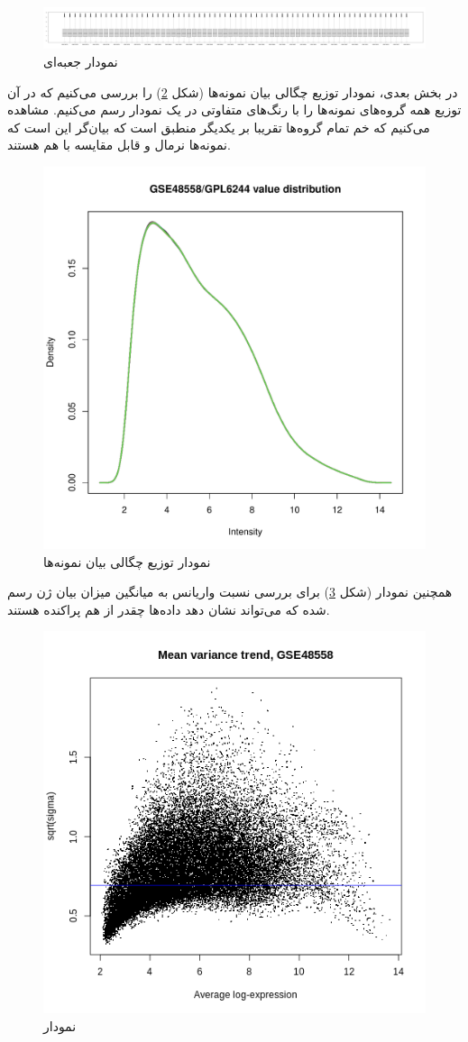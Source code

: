 \documentclass{article}
\begin{document}
\begin{figure}[h!]
	\centering
	\includegraphics[width=0.8\columnwidth]{figs/boxplot.pdf}
	\caption{نمودار جعبه‌ای}
	\label{fig:boxplot}
\end{figure}

در بخش بعدی، نمودار توزیع چگالی بیان نمونه‌ها (شکل \ref{fig:exp-val-dist}) را بررسی می‌کنیم که در آن توزیع همه گروه‌های نمونه‌ها را با رنگ‌های متفاوتی در یک نمودار رسم می‌کنیم. مشاهده می‌کنیم که خم تمام گروه‌ها تقریبا بر یکدیگر منطبق است که بیان‌گر این است که نمونه‌ها نرمال و قابل مقایسه با هم هستند.

\begin{figure}[h!]
	\centering
	\includegraphics[width=0.5\columnwidth]{figs/exp-val-dist.pdf}
	\caption{نمودار توزیع چگالی بیان نمونه‌ها}
	\label{fig:exp-val-dist}
\end{figure}

همچنین نمودار  (شکل \ref{fig:mean-var}) برای بررسی نسبت واریانس به میانگین میزان بیان ژن رسم شده که می‌تواند نشان دهد داده‌‌ها چقدر از هم پراکنده هستند.

\begin{figure}[h!]
	\centering
	\includegraphics[width=0.5\columnwidth]{figs/mean-var.png}
	\caption{نمودار }
	\label{fig:mean-var}
\end{figure}
\end{document}
